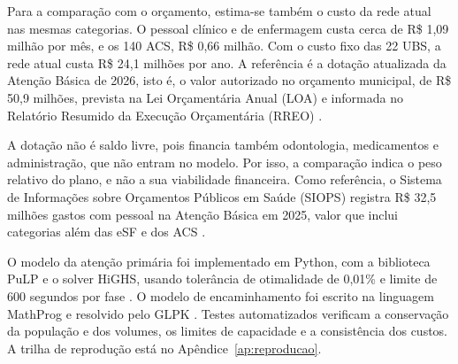 Para a comparação com o orçamento, estima-se também o custo da rede atual nas mesmas categorias. O
pessoal clínico e de enfermagem custa cerca de R\$ 1,09 milhão por mês, e os 140 ACS, R\$ 0,66 milhão.
Com o custo fixo das 22 UBS, a rede atual custa R\$ 24,1 milhões por ano. A referência é a dotação
atualizada da Atenção Básica de 2026, isto é, o valor autorizado no orçamento municipal, de
R\$ 50,9 milhões, prevista na Lei Orçamentária Anual (LOA) e informada no Relatório Resumido da Execução
Orçamentária (RREO) \citep{itauna2025,tesouro2026}.

A dotação não é saldo livre, pois financia também odontologia, medicamentos e administração, que não
entram no modelo. Por isso, a comparação indica o peso relativo do plano, e não a sua viabilidade
financeira. Como referência, o Sistema de Informações sobre Orçamentos Públicos em Saúde (SIOPS) registra
R\$ 32,5 milhões gastos com pessoal na Atenção Básica em 2025, valor que inclui categorias além das eSF e
dos ACS \citep{siops}.

O modelo da atenção primária foi implementado em Python, com a biblioteca PuLP e o solver HiGHS, usando
tolerância de otimalidade de 0,01\% e limite de 600 segundos por fase \citep{mitchell2011,huangfu2018}. O
modelo de encaminhamento foi escrito na linguagem MathProg e resolvido pelo GLPK \citep{glpk}. Testes
automatizados verificam a conservação da população e dos volumes, os limites de capacidade e a
consistência dos custos. A trilha de reprodução está no Apêndice~\ref{ap:reproducao}.
